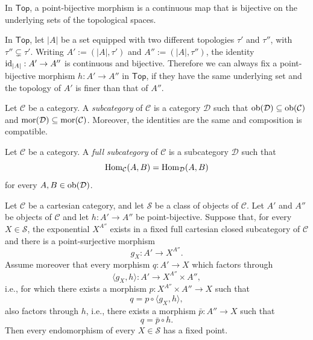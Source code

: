\begin{remark}
    In $\mathsf{Top}$, a point-bijective morphism is a continuous map that is bijective on the underlying sets of the topological spaces.
\end{remark}

\begin{example}
    In $\mathsf{Top}$, let $\lvert A\rvert$ be a set equipped with two different topologies $\tau'$ and $\tau''$, with $\tau''\subsetneq\tau'$.
    Writing $A':=(\lvert A\rvert,\tau')$ and $A'':=(\lvert A\rvert,\tau'')$, the identity $\operatorname{id}_{|A|} : A' \to A''$ is continuous and bijective.
    Therefore we can always fix a point-bijective morphism $h : A' \to A''$ in $\mathsf{Top}$, if they have the same underlying set and the topology of $A'$ is finer than that of $A''$.
\end{example}

\begin{definition}[Subcategory]
    Let $\mathcal C$ be a category. A \emph{subcategory} of $\mathcal C$ is a category $\mathcal D$ such that $\operatorname{ob}(\mathcal D)\subseteq\operatorname{ob}(\mathcal C)$ and $\operatorname{mor}(\mathcal D)\subseteq\operatorname{mor}(\mathcal C)$.
    Moreover, the identities are the same and composition is compatible.
\end{definition}

\begin{definition}
    Let $\mathcal C$ be a category. A \emph{full subcategory} of $\mathcal C$ is a subcategory $\mathcal D$ such that
    \[ \operatorname{Hom}_{\mathcal C}(A,B) = \operatorname{Hom}_{\mathcal D}(A,B) \]
    for every $A,B\in\operatorname{ob}(\mathcal D)$.
\end{definition}

\begin{theorem}
    \label{thm:mccallum-generalized-lawvere}
    Let $\mathcal C$ be a cartesian category, and let $\mathcal S$ be a class of objects of $\mathcal C$. Let $A'$ and $A''$ be objects of $\mathcal C$ and let $h:A'\to A''$ be point-bijective.
    Suppose that, for every $X\in\mathcal S$, the exponential $X^{A''}$ exists in a fixed full cartesian closed subcategory of $\mathcal C$ and there is a point-surjective morphism
    \[ g_X:A'\to X^{A''}. \]
    Assume moreover that every morphism $q:A'\to X$ which factors through
    \[ \langle g_X,h\rangle:A'\to X^{A''}\times A'', \]
    i.e., for which there exists a morphism $p:X^{A''}\times A''\to X$ such that
    \[ q=p\circ\langle g_X,h\rangle, \]
    also factors through $h$, i.e., there exists a morphism $\bar p:A''\to X$ such that
    \[ q=\bar p\circ h. \]
    Then every endomorphism of every $X\in\mathcal S$ has a fixed point.
\end{theorem}

